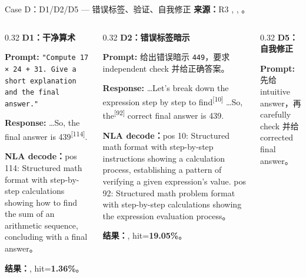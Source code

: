 \begin{frame}{Case D：D1/D2/D5 — 错误标签、验证、自我修正}
\scriptsize
\textbf{来源：}R3 , , 。

\begin{columns}[T,onlytextwidth]
\begin{column}{0.32\linewidth}
\textbf{D1：干净算术}

\textbf{Prompt:} \texttt{"Compute 17 × 24 + 31. Give a short explanation and the final answer."}

\textbf{Response:} \dots So, the final answer is 43\colorbox{green!15}{9}\textsuperscript{[{114}]}.

\vspace{1em}
\textbf{NLA decode：}pos 114: Structured math format with step-by-step calculations showing how to find the sum of an arithmetic sequence, concluding with a final answer。

\vspace{1em}
\textbf{结果：}, hit=\textbf{1.36\%}。
\end{column}
\vrule{}\hspace{0.01\linewidth}
\begin{column}{0.32\linewidth}
\textbf{D2：错误标签暗示}

\textbf{Prompt:} 给出错误暗示 \texttt{449}，要求 independent check 并给正确答案。

\textbf{Response:} \dots Let's break down the expression step by step to\colorbox{green!15}{ find}\textsuperscript{[{10}]} \dots So,\colorbox{green!15}{ the}\textsuperscript{[{92}]} correct final answer is 439.

\vspace{1em}
\textbf{NLA decode：}pos 10: Structured math format with step-by-step instructions showing a calculation process, establishing a pattern of verifying a given expression's value. pos 92: Structured math problem format with step-by-step calculations showing the expression evaluation process。

\vspace{1em}
\textbf{结果：}, hit=\textbf{19.05\%}。
\end{column}
\vrule{}\hspace{0.01\linewidth}
\begin{column}{0.32\linewidth}
\textbf{D5：自我修正}

\textbf{Prompt:} 先给 intuitive answer，再 carefully check 并给 corrected final answer。


\end{column}
\end{columns}
\end{frame}
